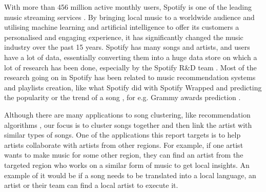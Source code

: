 With more than 456 million active monthly users, Spotify is one of the leading music streaming services \cite{spotify}. By bringing local music to a worldwide audience and utilising machine learning and artificial intelligence to offer its customers a personalised and engaging experience, it has significantly changed the music industry over the past 15 years. Spotify has many songs and artists, and users have a lot of data, essentially converting them into a huge data store on which a lot of research has been done, especially by the Spotify R\&D team \cite{researchpagespotify}. Most of the research going on in Spotify has been related to music recommendation systems and playlists creation, like what Spotify did with Spotify Wrapped \cite{wrappedspotify} and predicting the popularity or the trend of a song \cite{popularity}, for e.g. Grammy awards prediction \cite{grammy}.

Although there are many applications to song clustering, like recommendation algorithms \cite{acmpaper}, our focus is to cluster songs together and then link the artist with similar types of songs. One of the applications this report targets is to help artists collaborate with artists from other regions. For example, if one artist wants to make music for some other region, they can find an artist from the targeted region who works on a similar form of music to get local insights. An example of it would be if a song needs to be translated into a local language, an artist or their team can find a local artist to execute it.
